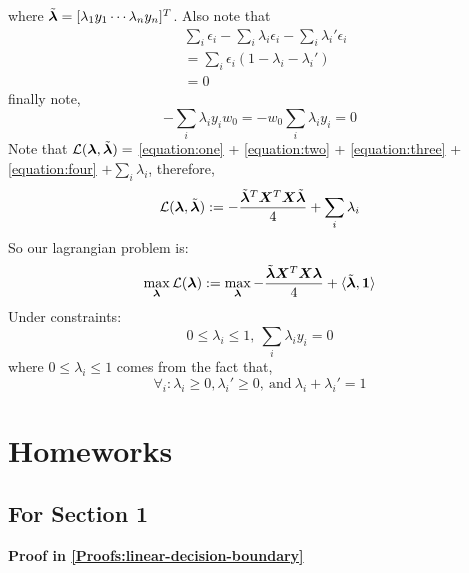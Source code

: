 \begin{appendices}
\begin{equation}
\end{equation}
where $\tilde{\bm{\lambda}} = [\lambda_{1} y_{1} \cdots \lambda_{n} y_{n}]^{T}$. Also note that
\begin{align}\label{equation:three}
    &{} \sum_{i} \epsilon_{i} - \sum_{i} \lambda_{i} \epsilon_{i} - \sum_{i} \lambda_{i}' \epsilon_{i} \\
    &= \sum_{i} \epsilon_{i} (1- \lambda_{i} -\lambda_{i}') \\
    &= 0
\end{align} 
finally note,
\begin{equation}\label{equation:four}
    -\sum_{i} \lambda_{i} y_{i} w_{0} = -w_{0} \sum_{i} \lambda_{i} y_{i} = 0
\end{equation}
Note that $\mathcal{L}(\bm{\lambda},\tilde{\bm{\lambda}})=$ \cref{equation:one} + \cref{equation:two} + \cref{equation:three} + \cref{equation:four} $+\sum_{i} \lambda_{i}$, therefore,
\begin{equation}
    \mathcal{L}(\bm{\lambda},\tilde{\bm{\lambda}}) := -\frac{\tilde{\bm{\lambda}}^{T} \bm{X}^{T} \bm{X} \tilde{\bm{\lambda}}}{4} + \sum_{i} \lambda_{i}
\end{equation}
So our lagrangian problem is:
\begin{equation}
    \max_{\bm{\lambda}} \mathcal{L}(\bm{\lambda}) := \max_{\bm{\lambda}} - \frac{\tilde{\bm{\lambda}} \bm{X}^{T} \bm{X} \bm{\lambda}}{4} + \langle \tilde{\bm{\lambda}} , \bm{1} \rangle
\end{equation}
Under constraints:
\begin{equation}
    0 \leq \lambda_{i} \leq 1, \: \sum_{i} \lambda_{i} y_{i} =0
\end{equation}
where $0 \leq \lambda_{i} \leq 1$ comes from the fact that,
\begin{equation}
    \forall_{i}: \lambda_{i} \geq 0, \lambda_{i}' \geq 0, \: \text{and} \: \lambda_{i} + \lambda_{i}' = 1
\end{equation}


\newpage
\section{Homeworks}
\subsection{For Section 1}
\begin{question}
    \textbf{Proof in \cref{Proofs:linear-decision-boundary}}
\end{question}


\end{appendices}

